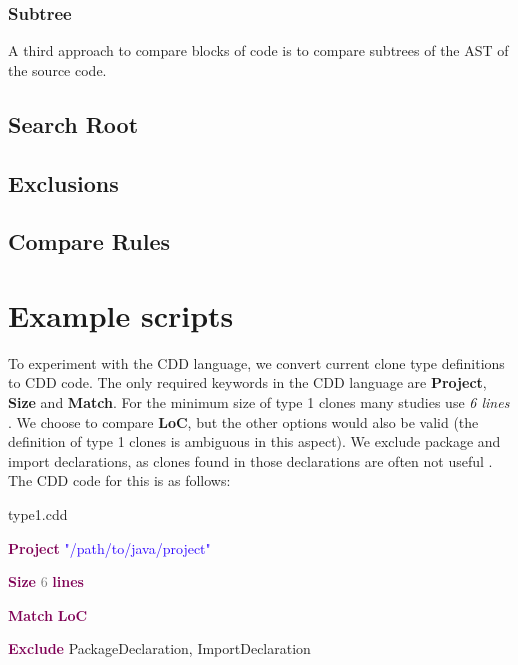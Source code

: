 \documentclass[sigplan,10pt,review,anonymous]{acmart}
\begin{document}
\subsubsection{Subtree}
A third approach to compare blocks of code is to compare subtrees of the AST of the source code.

\subsection{Search Root}

\subsection{Exclusions}

\subsection{Compare Rules}

\section{Example scripts}
To experiment with the CDD language, we convert current clone type definitions to CDD code. The only required keywords in the CDD language are \textbf{Project}, \textbf{Size} and \textbf{Match}. For the minimum size of type 1 clones many studies use \textit{6 lines} \cite{heitlager2007practical, bruntink2004evaluation, sajnani2016sourcerercc}. We choose to compare \textbf{LoC}, but the other options would also be valid (the definition of type 1 clones is ambiguous in this aspect). We exclude package and import declarations, as clones found in those declarations are often not useful \cite{koschke2012large}. The CDD code for this is as follows:

\noindent\makebox[\linewidth]{\rule{\linewidth}{0.4pt}}
\noindent type1.cdd\par
\noindent\makebox[\linewidth]{\rule{\linewidth}{0.4pt}}
\noindent\textbf{\textcolor[HTML]{7F0055}{Project}} \textcolor[HTML]{2A00FF}{"/path/to/java/project"} \par
\noindent\textbf{\textcolor[HTML]{7F0055}{Size}} \textcolor[HTML]{7D7D7D}{6} \textbf{\textcolor[HTML]{7F0055}{lines}}  \par
\noindent\textbf{\textcolor[HTML]{7F0055}{Match}} \textbf{\textcolor[HTML]{7F0055}{LoC}}  \par
\noindent\textbf{\textcolor[HTML]{7F0055}{Exclude}} PackageDeclaration, ImportDeclaration \\
\noindent\makebox[\linewidth]{\rule{\linewidth}{0.4pt}}
\end{document}
